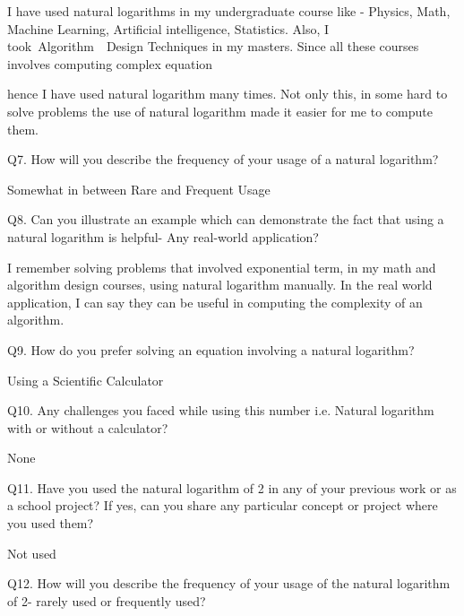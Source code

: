 \documentclass[12pt]{article}
\begin{document}
I have used natural logarithms in my undergraduate course like - Physics, Math, Machine Learning, Artificial intelligence, Statistics. Also, I took\  Algorithm\ \ Design  Techniques in my masters. Since all these courses involves computing complex equation\par

hence I have used natural logarithm many times. Not only this, in some hard to solve problems the use of natural logarithm made it easier for me to compute them.\par


\vspace{\baselineskip}
Q7. How will you describe the frequency of your usage of a natural logarithm?\par

Somewhat in between Rare and Frequent Usage\par

Q8. Can you illustrate an example which can demonstrate the fact that using a natural logarithm is helpful- Any real-world application?\par

I remember solving problems that involved exponential term, in my math and algorithm design courses, using natural logarithm manually. In the real world application, I can say they can be useful in computing the complexity of an algorithm.\par


\vspace{\baselineskip}
Q9. How do you prefer solving an equation involving a natural logarithm?\par

Using a Scientific Calculator \par

Q10. Any challenges you faced while using this number i.e. Natural logarithm with or without a calculator?\par

None\par


\vspace{\baselineskip}
Q11. Have you used the natural logarithm of 2 in any of your previous work or as a school project? If yes, can you share any particular concept or project where you used them?\par

Not used\par

Q12. How will you describe the frequency of your usage of the natural logarithm of 2- rarely used or frequently used?\par
\end{document}
